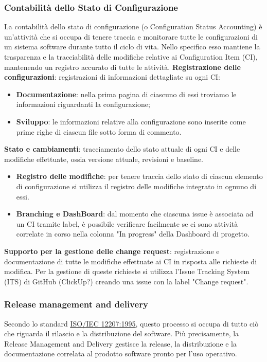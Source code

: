 \subsubsection{Contabilità dello Stato di Configurazione}
La contabilità dello stato di configurazione (o Configuration Status Accounting) è un'attività
che si occupa di tenere traccia e monitorare tutte le configurazioni di un sistema software
durante tutto il ciclo di vita. Nello specifico esso mantiene la trasparenza e la tracciabilità delle modifiche relative ai Configuration Item (CI),
mantenendo un registro accurato di tutte le attività.
\textbf{Registrazione delle configurazioni}: registrazioni di informazioni dettagliate su ogni CI:
\begin{itemize}
	\item \textbf{Documentazione}: nella prima pagina di ciascuno di essi troviamo le informazioni riguardanti la configurazione;
	\item \textbf{Sviluppo}: le informazioni relative alla configurazione sono inserite come prime
	      righe di ciascun file sotto forma di commento.
\end{itemize}
\textbf{Stato e cambiamenti}: tracciamento dello stato attuale di ogni CI e delle modifiche effettuate, ossia versione attuale, revisioni e baseline.
\begin{itemize}
	\item \textbf{Registro delle modifiche}: per tenere traccia dello stato di ciascun elemento di configurazione si utilizza il registro
	      delle modifiche integrato in ognuno di essi.
	\item \textbf{Branching e DashBoard}: dal momento che ciascuna issue è associata ad un CI tramite
	      label, è possibile verificare facilmente se ci sono attività correlate
	      in corso nella colonna "In progress" della Dashboard di progetto.
\end{itemize}
\textbf{Supporto per la gestione delle change request}: registrazione e documentazione di tutte le modifiche effettuate ai CI in risposta alle
richieste di modifica. Per la gestione di queste richieste si utilizza l'Issue Tracking System (ITS) di GitHub (ClickUp?) creando una
issue con la label "Change request".

\subsubsection{Release management and delivery}
Secondo lo standard \href{https://www.math.unipd.it/~tullio/IS-1/2009/Approfondimenti/ISO_12207-1995.pdf}{\underline{ISO/IEC 12207:1995}},
questo processo si occupa di tutto ciò che riguarda il rilascio e la distribuzione del software. Più precisamente,
la Release Management and Delivery gestisce la release, la distribuzione e la documentazione correlata al prodotto software
pronto per l'uso operativo.

